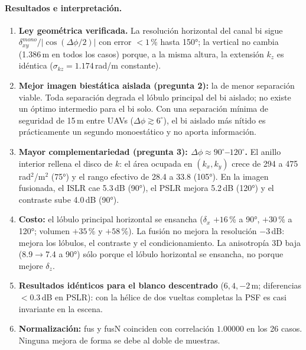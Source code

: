 \paragraph{Resultados e interpretación.}
\begin{enumerate}[itemsep=3pt]
  \item \textbf{Ley geométrica verificada.} La resolución horizontal del canal bi
  sigue $\delta_{xy}^{mono}/|\cos(\Delta\phi/2)|$ con error $<1$\,\% hasta
  150°; la vertical no cambia (1.386\,m en todos los casos) porque, a la misma
  altura, la extensión $k_z$ es idéntica ($\sigma_{kz}=1.174$\,rad/m constante).
  \item \textbf{Mejor imagen biestática aislada (pregunta 2):} la de menor separación
  viable. Toda separación degrada el lóbulo principal del bi aislado; no
  existe un óptimo intermedio para el bi solo. Con una separación mínima de
  seguridad de 15\,m entre UAVs ($\Delta\phi\gtrsim6^{\circ}$), el bi aislado más
  nítido es prácticamente un segundo monoestático y no aporta información.
  \item \textbf{Mayor complementariedad (pregunta 3): $\Delta\phi\approx90^{\circ}$--$120^{\circ}$.} El anillo
  interior rellena el disco de $k$: el área ocupada en $(k_x,k_y)$ crece de
  294 a 475\,rad$^2$/m$^2$ (75°) y el rango efectivo de 28.4 a 33.8 (105°).
  En la imagen fusionada, el ISLR cae 5.3\,dB (90°), el PSLR mejora 5.2\,dB
  (120°) y el contraste sube 4.0\,dB (90°).
  \item \textbf{Costo:} el lóbulo principal horizontal se ensancha
  ($\delta_x$ $+16$\,\% a 90°, $+30$\,\% a 120°; volumen $+35$\,\% y $+58$\,\%).
  La fusión no mejora la resolución $-3$\,dB: mejora los lóbulos, el contraste y el
  condicionamiento. La anisotropía 3D baja (8.9$\to$7.4 a 90°) sólo porque el lóbulo
  horizontal se ensancha, no porque mejore $\delta_z$.
  \item \textbf{Resultados idénticos para el blanco descentrado} ($6,4,-2$\,m;
  diferencias $<0.3$\,dB en PSLR): con la hélice de dos vueltas completas la
  PSF es casi invariante en la escena.
  \item \textbf{Normalización:} fus y fusN coinciden con correlación $1.00000$ en
  los 26 casos. Ninguna mejora de forma se debe al doble de muestras.
\end{enumerate}

